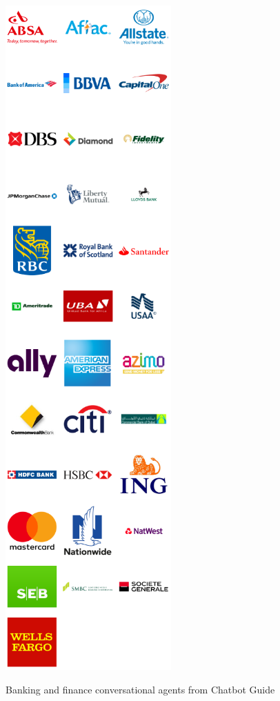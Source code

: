 \documentclass{sigchi-ext}
\begin{document}
\begin{marginfigure}[-17pc]
  \begin{minipage}{\marginparwidth}
    \centering
    \includegraphics[width=0.8\marginparwidth]{figures/chatbot.png}
    \caption{Banking and finance conversational agents from Chatbot Guide \cite{chatbotguide}}
    \label{fig:chatbots}
  \end{minipage}
\end{marginfigure}
\end{document}
